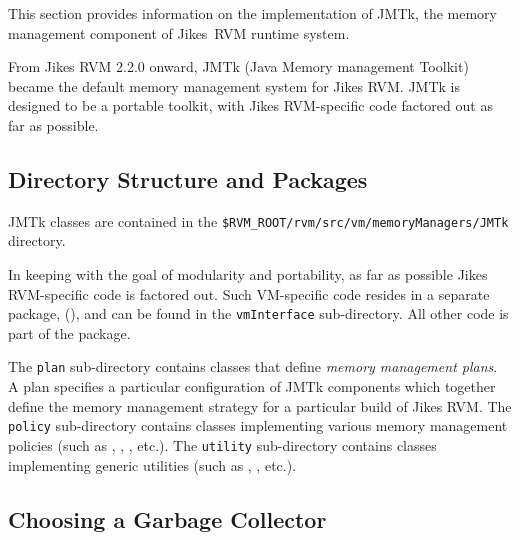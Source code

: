 
This section provides information on the implementation of JMTk, the
memory management component of Jikes\trademark\ RVM runtime system.

From Jikes RVM 2.2.0 onward, JMTk (Java Memory management
Toolkit) became the default memory management system for Jikes RVM.
JMTk is designed to be a portable toolkit, with Jikes
RVM-specific code factored out as far as possible.

\subsection{Directory Structure and Packages} \label{sssec:directories}

JMTk classes are contained in the
\texttt{\$RVM\_ROOT/rvm/src/vm/memoryManagers/JMTk} directory.

In keeping with the goal of modularity and portability, as far as
possible Jikes RVM-specific code is factored out.  Such VM-specific
code resides in a separate package,
(),
and can be found in the \texttt{vmInterface} sub-directory.  All other
code is part of the
package.

The \texttt{plan} sub-directory contains classes that define
\emph{memory management plans}.  A plan specifies a particular
configuration of JMTk components which together define the memory
management strategy for a particular build of Jikes RVM.  The
\texttt{policy} sub-directory contains classes implementing various
memory management policies (such as , , , etc.).  The \texttt{utility}
sub-directory contains classes implementing generic utilities (such as
,
, etc.).

\subsection{Choosing a Garbage Collector} \label{ssec:choosinggc}

